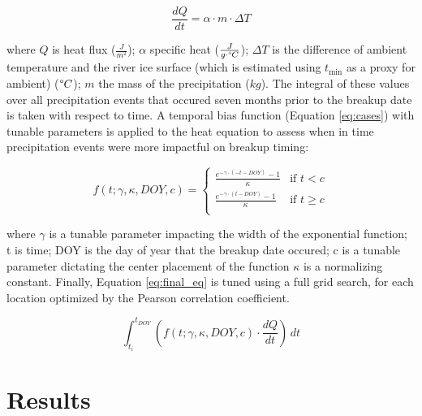 \documentclass[draft]{AR_analysis_}
\begin{document}
\begin{equation}
\frac{dQ}{dt} = \alpha \cdot m \cdot \Delta T 
	\label{eq:heat_transport}
\end{equation}

\noindent where $Q$ is heat flux ($\frac{J}{m^2}$); $\alpha$ specific heat 
($\frac{J}{g \cdot \degree C}$); $\Delta T$ is the difference of 
ambient temperature and the river ice surface (which is estimated 
using $t_{\text{min}}$ as a proxy for ambient) ($\degree C$); $m$ 
the mass of the precipitation ($kg$). The integral of these values
over all precipitation events that occured seven months prior to the
breakup date is taken with respect to time. A temporal bias function
(Equation \ref{eq:cases})
with tunable parameters is applied to the heat equation to assess when in
time precipitation events were more impactful on breakup timing:

\begin{equation}
	\label{eq:cases}
	f(t; \gamma, \kappa, DOY, c) =
	\begin{cases}
    	\frac{e^{-\gamma \cdot (-t - DOY)} - 1}{\kappa} & \text{if }
        	t < c \\
    	\frac{e^{-\gamma \cdot (t - DOY)} - 1}{\kappa} & \text{if }
        	t \geq c \\
	\end{cases}
\end{equation}

\noindent where $\gamma$ is a tunable parameter impacting the width of
the exponential function; t is time; DOY is the day of year
that the breakup date occured; c is a tunable parameter dictating the
center placement of the function $\kappa$ is a normalizing constant.
Finally, Equation \ref{eq:final_eq} is tuned using a full grid search, for each
location optimized by the Pearson correlation coefficient. 

\begin{equation}
\label{eq:final_eq}
	\int_{t_i}^{t_{DOY}} \left(f(t; \gamma, \kappa, DOY, c) \cdot
	\frac{dQ}{dt}\right) \, dt
\end{equation}



\section{Results} 
\end{document}
